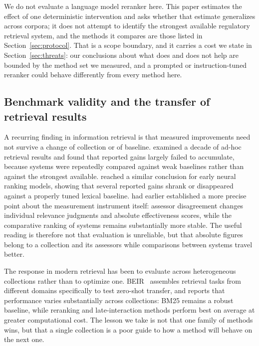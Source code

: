 \documentclass[a4paper,fleqn]{cas-sc}
\begin{document}
We do not evaluate a language model reranker here. This paper estimates the effect of one deterministic intervention and asks whether that estimate generalizes across corpora; it does not attempt to identify the strongest available regulatory retrieval system, and the methods it compares are those listed in Section~\ref{sec:protocol}. That is a scope boundary, and it carries a cost we state in Section~\ref{sec:threats}: our conclusions about what does and does not help are bounded by the method set we measured, and a prompted or instruction-tuned reranker could behave differently from every method here.

\subsection{Benchmark validity and the transfer of retrieval results}
\label{sec:related-benchmarks}

A recurring finding in information retrieval is that measured improvements need not survive a change of collection or of baseline.
\citet{Armstrong2009} examined a decade of ad-hoc retrieval results and found that reported gains largely failed to accumulate, because systems were repeatedly compared against weak baselines rather than against the strongest available.
\citet{Yang2019} reached a similar conclusion for early neural ranking models, showing that several reported gains shrank or disappeared against a properly tuned lexical baseline.
\citet{Voorhees2000} had earlier established a more precise point about the measurement instrument itself: assessor disagreement changes individual relevance judgments and absolute effectiveness scores, while the comparative ranking of systems remains substantially more stable.
The useful reading is therefore not that evaluation is unreliable, but that absolute figures belong to a collection and its assessors while comparisons between systems travel better.

The response in modern retrieval has been to evaluate across heterogeneous collections rather than to optimize one.
BEIR~\citep{Thakur2021} assembles retrieval tasks from different domains specifically to test zero-shot transfer, and reports that performance varies substantially across collections: BM25 remains a robust baseline, while reranking and late-interaction methods perform best on average at greater computational cost.
The lesson we take is not that one family of methods wins, but that a single collection is a poor guide to how a method will behave on the next one.
\end{document}

